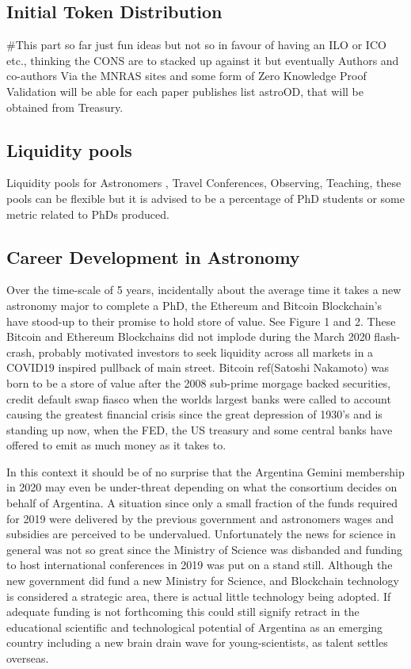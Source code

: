 \documentclass[final,5p,times,twocolumn,authoryear]{elsarticle}
\begin{document}
\subsection{Initial Token Distribution}
#This part so far just fun ideas but not so in favour of having an ILO or ICO etc., thinking the CONS are to stacked up against it but eventually 
Authors and co-authors Via the MNRAS sites and some form of Zero Knowledge Proof Validation will be able for each paper publishes list astroOD, that will be obtained from Treasury.

\subsection{Liquidity pools}

Liquidity pools for Astronomers , Travel Conferences, Observing, Teaching, these pools can be flexible but it is advised to be a percentage of PhD  students or some metric related to PhDs produced. 

\subsection{Career Development in Astronomy}

Over the time-scale of 5 years, incidentally about the average time it takes a new astronomy major to complete a PhD, the Ethereum and Bitcoin Blockchain's have stood-up to their promise to hold store of value. See Figure 1 and 2. These Bitcoin and Ethereum Blockchains did not implode during the March 2020 flash-crash, probably motivated investors to seek liquidity across all markets in a COVID19 inspired pullback of main street.  Bitcoin ref(Satoshi Nakamoto) was born to be a store of value after the 2008 sub-prime morgage backed securities, credit default swap fiasco when the worlds largest banks were called to account causing the greatest financial crisis since the great depression of 1930's and is standing up now, when the FED, the US treasury and some central banks have offered to emit as much money as it takes to.
 
In this context it should be of no surprise that the Argentina Gemini membership in 2020 may even be under-threat depending on what the consortium decides on behalf of Argentina. A situation since only a small fraction of the funds required for 2019 were delivered by the previous government and astronomers wages and subsidies are perceived to be undervalued. Unfortunately the news for science in general was not so great since the Ministry of Science was disbanded and funding to host international conferences in 2019 was put on a stand still. Although the new government did fund a new Ministry for Science, and Blockchain technology is considered a strategic area, there is actual little technology being adopted. If adequate funding is not forthcoming this could still signify retract in the educational scientific and technological potential of Argentina as an emerging country including a new brain drain wave for young-scientists, as talent settles overseas. 
\end{document}
